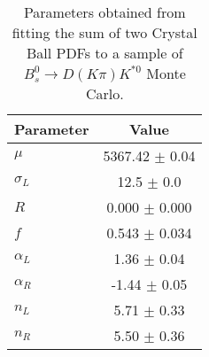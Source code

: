 \begin{table}
  \centering
  \begin{tabular}{lc}
      \toprule
      Parameter & Value \\
      \midrule
      $\mu$ & 5367.42 $\pm$ 0.04 \\
      $\sigma_L$ & 12.5 $\pm$ 0.0 \\
      $R$ & 0.000 $\pm$ 0.000 \\
      $f$ & 0.543 $\pm$ 0.034 \\
      $\alpha_L$ & 1.36 $\pm$ 0.04 \\
      $\alpha_R$ & -1.44 $\pm$ 0.05 \\
      $n_L$ & 5.71 $\pm$ 0.33 \\
      $n_R$ & 5.50 $\pm$ 0.36 \\
  \bottomrule
  \end{tabular}
  \caption{Parameters obtained from fitting the sum of two Crystal Ball PDFs to a sample of $B^0_s \to D(K\pi)K^{*0}$ Monte Carlo.}
\label{tab:signal_Bs_MC_params}
\end{table}
